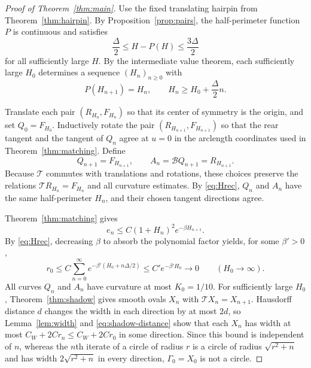 \documentclass[11pt]{article}
\numberwithin{equation}{section}
\newcommand{\Tmap}{\mathcal T}
\newcommand{\Bmap}{\mathcal B}
\begin{document}
\begin{proof}[Proof of Theorem~\ref{thm:main}]
Use the fixed translating hairpin from Theorem~\ref{thm:hairpin}. By
Proposition~\ref{prop:pairs}, the half-perimeter function \(P\) is
continuous and satisfies
\[
  \frac\Delta2\leq H-P(H)\leq\frac{3\Delta}2
\]
for all sufficiently large \(H\). By the intermediate value theorem, each
sufficiently large \(H_0\) determines a sequence \((H_n)_{n\geq0}\) with
\begin{equation}\label{eq:Hrec}
  P(H_{n+1})=H_n,\qquad H_n\geq H_0+\frac{\Delta}{2}n.
\end{equation}

Translate each pair \((R_{H_n},F_{H_n})\) so that its center of symmetry
is the origin, and set \(Q_0=F_{H_0}\). Inductively rotate the pair
\((R_{H_{n+1}},F_{H_{n+1}})\) so that the rear tangent and the tangent of
\(Q_n\) agree at \(u=0\) in the arclength coordinates used in
Theorem~\ref{thm:matching}. Define
\[
  Q_{n+1}=F_{H_{n+1}},\qquad A_n=\Bmap Q_{n+1}=R_{H_{n+1}}.
\]
Because \(\Tmap\) commutes with translations and rotations, these choices
preserve the relations \(\Tmap R_{H_n}=F_{H_n}\) and all curvature
estimates. By \eqref{eq:Hrec},
\(Q_n\) and \(A_n\) have the same half-perimeter \(H_n\), and their chosen
tangent directions agree.

Theorem~\ref{thm:matching} gives
\[
  e_n\leq C(1+H_n)^2e^{-\beta H_{n+1}}.
\]
By \eqref{eq:Hrec}, decreasing \(\beta\) to absorb the polynomial factor
yields, for some \(\beta'>0\),
\[
  r_0\leq C\sum_{n=0}^\infty e^{-\beta'(H_0+n\Delta/2)}
      \leq C'e^{-\beta'H_0}\longrightarrow0
      \qquad(H_0\to\infty).
\]
All curves \(Q_n\) and \(A_n\) have curvature at most
\(K_0=1/10\). For sufficiently large \(H_0\),
Theorem~\ref{thm:shadow} gives smooth ovals \(X_n\) with
\(\Tmap X_n=X_{n+1}\). Hausdorff distance \(d\) changes the width in each
direction by at most \(2d\), so Lemma~\ref{lem:width} and
\eqref{eq:shadow-distance} show that each \(X_n\) has width at most
\(C_W+2Cr_n\leq C_W+2Cr_0\) in some direction. Since this bound is
independent of \(n\), whereas the \(n\)th iterate of a circle of
radius \(r\) is a circle of radius \(\sqrt{r^2+n}\) and has width
\(2\sqrt{r^2+n}\) in every direction, \(\Gamma_0=X_0\) is not a circle.
\end{proof}
\end{document}
